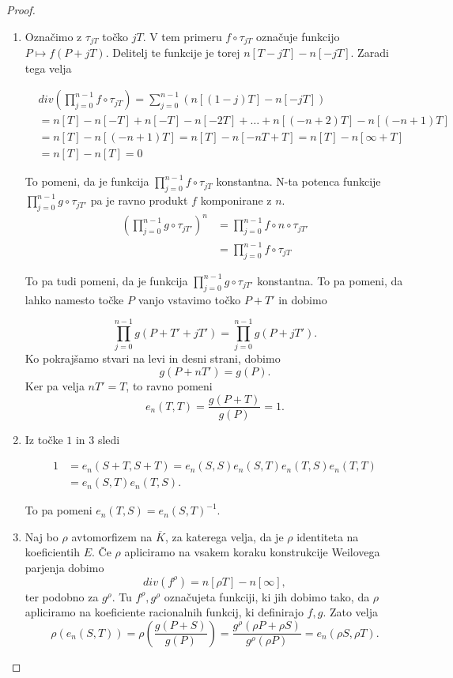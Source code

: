 \documentclass[12pt,a4paper,twoside]{article}
\theoremstyle{definition} %
\theoremstyle{plain} %
\numberwithin{equation}{section}  %
\begin{document}
\begin{proof}
\begin{enumerate}
\item Označimo z $\tau_{jT}$ točko $jT$. V tem primeru $f \circ \tau_{jT}$ označuje funkcijo \newline $P \mapsto f(P+jT)$. Delitelj te funkcije je torej $n[T-jT]-n[-jT]$. Zaradi tega velja

\begin{align}
&{}div(\prod_{j=0}^{n-1}f\circ \tau_{jT}) = \sum_{j=0}^{n-1}(n[(1-j)T]-n[-jT]) \nonumber \\
&{} = n[T] - n[-T] + n[-T] - n[-2T]+ \dots + n[(-n+2)T]-n[(-n+1)T]  \nonumber \\
&{} = n[T]-n[(-n+1)T] = n[T]-n[-nT+T] = n[T] - n[\infty +T] \nonumber \\
&{} = n[T]-n[T] = 0 \nonumber
\end{align}

To pomeni, da je funkcija $\prod_{j=0}^{n-1}f\circ \tau_{jT}$ konstantna. N-ta potenca funkcije $\prod_{j=0}^{n-1}g\circ \tau_{jT'}$ pa je ravno produkt $f$ komponirane z $n$. 
\begin{align}
(\prod_{j=0}^{n-1}g\circ \tau_{jT'})^n &{}= \prod_{j=0}^{n-1}f \circ n \circ \tau_{jT'} \nonumber \\
&{}= \prod_{j=0}^{n-1}f \circ \tau_{jT}  \nonumber %
\end{align}

To pa tudi pomeni, da je funkcija $\prod_{j=0}^{n-1}g\circ \tau_{jT'}$ konstantna.
To pa pomeni, da lahko namesto točke $P$ vanjo vstavimo točko $P+T'$ in dobimo

$$\prod_{j=0}^{n-1}g( P + T'+jT') = \prod_{j=0}^{n-1}g(P+jT') .$$
Ko pokrajšamo stvari na levi in desni strani, dobimo
$$g(P+nT') = g(P).$$
Ker pa velja $nT' = T$, to ravno pomeni
$$e_n(T,T) = \frac{g(P+T)}{g(P)} = 1.$$


\item Iz točke $1$ in $3$ sledi

\begin{align}
1 &{}= e_n(S+T,S+T) = e_n(S,S)e_n(S,T)e_n(T,S)e_n(T,T) \nonumber \\
 &{} = e_n(S,T)e_n(T,S). \nonumber
\end{align}

To pa pomeni $e_n(T,S) = e_n(S,T)^{-1}$.

\item Naj bo $\rho$ avtomorfizem na $\overline{K}$, za katerega velja, da je $\rho$ identiteta na koeficientih $E$. Če $\rho$ apliciramo na vsakem koraku konstrukcije Weilovega parjenja dobimo
$$div(f^{\rho}) = n[\rho T] - n[\infty],$$
ter podobno za $g^{\rho}$. Tu $f^{\rho},g^{\rho}$ označujeta funkciji, ki jih dobimo tako, da $\rho$ apliciramo na koeficiente racionalnih funkcij, ki definirajo $f,g$.
Zato velja
$$\rho(e_n(S,T)) = \rho \left( \frac{g(P+S)}{g(P)} \right) = \frac{g^{\rho}(\rho P+\rho S)}{g^{\rho}(\rho P)} = e_n(\rho S,\rho T).$$


\end{enumerate}
\end{proof}
\end{document}
